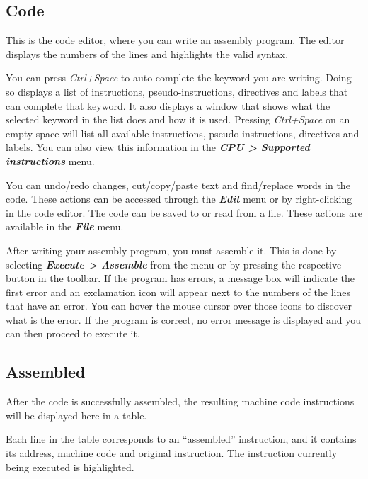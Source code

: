 \documentclass[11pt,a4paper,twoside,titlepage]{article}
\newcommand{\menupath}[1]{\textbf{\emph{#1}}}
\begin{document}
\subsection{Code}

This is the code editor, where you can write an assembly program.
The editor displays the numbers of the lines and highlights the valid syntax.

You can press \emph{Ctrl+Space} to auto-complete the keyword you are writing.
Doing so displays a list of instructions, pseudo-instructions, directives and
labels that can complete that keyword.
It also displays a window that shows what the selected keyword in the list does
and how it is used.
Pressing \emph{Ctrl+Space} on an empty space will list all available
instructions, pseudo-instructions, directives and labels.
You can also view this information in the 
\menupath{CPU > Supported instructions} menu.

You can undo/redo changes, cut/copy/paste text and find/replace words in the
code. These actions can be accessed through the \menupath{Edit} menu or by
right-clicking in the code editor.
The code can be saved to or read from a file. These actions are available in
the \menupath{File} menu.

After writing your assembly program, you must assemble it.
This is done by selecting \menupath{Execute > Assemble} from the menu or by
pressing the respective button in the toolbar.
If the program has errors, a message box will indicate the first error and an
exclamation icon will appear next to the numbers of the lines that have an
error.
You can hover the mouse cursor over those icons to discover what is the error.
If the program is correct, no error message is displayed and you can then
proceed to execute it.


\subsection{Assembled}

After the code is successfully assembled, the resulting machine code 
instructions will be displayed here in a table.

Each line in the table corresponds to an ``assembled'' instruction, and it
contains its address, machine code and original instruction.
The instruction currently being executed is highlighted.
\end{document}
